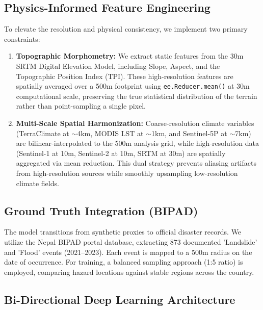 \documentclass[journal,twoside]{IEEEtran}
\begin{document}
\subsection{Physics-Informed Feature Engineering}
To elevate the resolution and physical consistency, we implement two primary constraints:
\begin{enumerate}
    \item \textbf{Topographic Morphometry:} We extract static features from the 30m SRTM Digital Elevation Model, including Slope, Aspect, and the Topographic Position Index (TPI). These high-resolution features are spatially averaged over a 500m footprint using \texttt{ee.Reducer.mean()} at 30m computational scale, preserving the true statistical distribution of the terrain rather than point-sampling a single pixel.
    \item \textbf{Multi-Scale Spatial Harmonization:} Coarse-resolution climate variables (TerraClimate at $\sim$4km, MODIS LST at $\sim$1km, and Sentinel-5P at $\sim$7km) are bilinear-interpolated to the 500m analysis grid, while high-resolution data (Sentinel-1 at 10m, Sentinel-2 at 10m, SRTM at 30m) are spatially aggregated via mean reduction. This dual strategy prevents aliasing artifacts from high-resolution sources while smoothly upsampling low-resolution climate fields.
\end{enumerate}

\subsection{Ground Truth Integration (BIPAD)}
The model transitions from synthetic proxies to official disaster records. We utilize the Nepal BIPAD portal database, extracting 873 documented 'Landslide' and 'Flood' events (2021--2023). Each event is mapped to a 500m radius on the date of occurrence. For training, a balanced sampling approach (1:5 ratio) is employed, comparing hazard locations against stable regions across the country.

\subsection{Bi-Directional Deep Learning Architecture}
\end{document}
